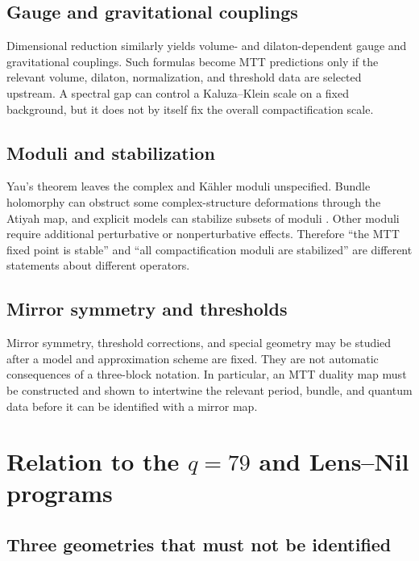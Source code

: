 \documentclass[11pt]{article}
\theoremstyle{definition}
\theoremstyle{remark}
\begin{document}
\subsection{Gauge and gravitational couplings}

Dimensional reduction similarly yields volume- and dilaton-dependent gauge
and gravitational couplings.  Such formulas become MTT predictions only if
the relevant volume, dilaton, normalization, and threshold data are selected
upstream.  A spectral gap can control a Kaluza--Klein scale on a fixed
background, but it does not by itself fix the overall compactification scale.

\subsection{Moduli and stabilization}

Yau's theorem leaves the complex and K\"ahler moduli unspecified.  Bundle
holomorphy can obstruct some complex-structure deformations through the
Atiyah map, and explicit models can stabilize subsets of moduli
\cite{AndersonEtAl2011}.  Other moduli require additional perturbative or
nonperturbative effects.  Therefore ``the MTT fixed point is stable'' and
``all compactification moduli are stabilized'' are different statements
about different operators.

\subsection{Mirror symmetry and thresholds}

Mirror symmetry, threshold corrections, and special geometry may be studied
after a model and approximation scheme are fixed.  They are not automatic
consequences of a three-block notation.  In particular, an MTT duality map
must be constructed and shown to intertwine the relevant period, bundle, and
quantum data before it can be identified with a mirror map.

\section{Relation to the \(q=79\) and Lens--Nil programs}
\label{sec:q79}

\subsection{Three geometries that must not be identified}
\end{document}
